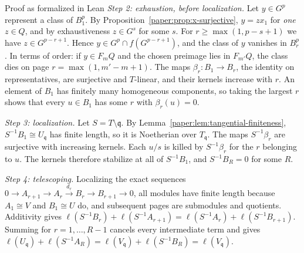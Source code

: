 \documentclass[11pt]{amsart}
\numberwithin{equation}{section}
\theoremstyle{plain}
\theoremstyle{remark}
\begin{document}
\begin{AIaddition}{Proof as formalized in Lean}
\emph{Step 2: exhaustion, before localization.} Let $y\in G^p$ represent a
class of $B_1^p$. By Proposition~\ref{paper:prop:x-surjective}, $y=zx_1$ for
\emph{one} $z\in Q$, and by exhaustiveness $z\in G^s$ for some $s$. For
$r\ge\max(1,p-s+1)$ we have $z\in G^{p-r+1}$. Hence
$y\in G^p\cap f(G^{p-r+1})$, and the class of $y$ vanishes in $B_r^p$. In
terms of order: if $y\in F_mQ$ and the chosen preimage lies in $F_{m'}Q$, the
class dies on page $r=\max(1,m'-m+1)$. The maps $\beta_r\colon B_1\to B_r$,
the identity on representatives, are surjective and $T$-linear, and their
kernels increase with $r$. An element of $B_1$ has finitely many homogeneous
components, so taking the largest $r$ shows that every $u\in B_1$ has some
$r$ with $\beta_r(u)=0$.

\emph{Step 3: localization.} Let $S=T\setminus\mathfrak q$. By
Lemma~\ref{paper:lem:tangential-finiteness}, $S^{-1}B_1\cong U_{\mathfrak q}$ has
finite length, so it is Noetherian over $T_{\mathfrak q}$. The maps
$S^{-1}\beta_r$ are surjective with increasing kernels. Each $u/s$ is killed
by $S^{-1}\beta_r$ for the $r$ belonging to $u$. The kernels therefore
stabilize at all of $S^{-1}B_1$, and $S^{-1}B_R=0$ for some $R$.

\emph{Step 4: telescoping.} Localizing the exact sequences
$0\to A_{r+1}\to A_r\xrightarrow{d_r}B_r\to B_{r+1}\to0$, all modules have
finite length because $A_1\cong V$ and $B_1\cong U$ do, and subsequent pages
are submodules and quotients. Additivity gives
$\ell(S^{-1}B_r)+\ell(S^{-1}A_{r+1})=
\ell(S^{-1}A_r)+\ell(S^{-1}B_{r+1})$.
Summing for $r=1,\ldots,R-1$ cancels every intermediate term and gives
$\ell(U_{\mathfrak q})+\ell(S^{-1}A_R)=\ell(V_{\mathfrak q})
+\ell(S^{-1}B_R)=\ell(V_{\mathfrak q})$.
\end{AIaddition}
\end{document}

